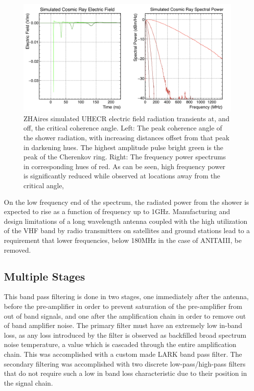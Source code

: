 \begin{figure}
\centering
	\includegraphics[width=\textwidth]{figures/CosmicRayOffAngle}
	\caption{ZHAires simulated UHECR electric field radiation transients at, and off, the critical coherence angle.  Left: The peak coherence angle of the shower radiation, with increasing distances offset from that peak in darkening hues.  The highest amplitude pulse bright green is the peak of the Cherenkov ring.  Right: The frequency power spectrums in corresponding hues of red.  As can be seen, high frequency power is significantly reduced while observed at locations away from the critical angle,  }
	\label{fig:CROffAngle}
\end{figure}	

		On the low frequency end of the spectrum, the radiated power from the shower is expected to rise as a function of frequency up to 1GHz.  Manufacturing and design limitations of a long wavelength antenna coupled with the high utilization of the VHF band by radio transmitters on satellites and ground stations lead to a requirement that lower frequencies, below 180MHz in the case of ANITAIII, be removed.
		
	\subsection{Multiple Stages}
		This band pass filtering is done in two stages, one immediately after the antenna, before the pre-amplifier in order to prevent saturation of the pre-amplifier from out of band signals, and one after the amplification chain in order to remove out of band amplifier noise.  The primary filter must have an extremely low in-band loss, as any loss introduced by the filter is observed as backfilled broad spectrum noise temperature, a value which is cascaded through the entire amplification chain.  This was accomplished with a custom made LARK band pass filter.  The secondary filtering was accomplished with two discrete low-pass/high-pass filters that do not require such a low in band loss characteristic due to their position in the signal chain.
		

